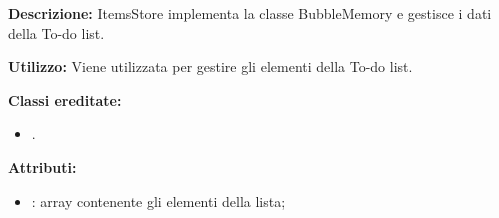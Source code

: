 \subparagraph[::ItemStore]{\class}\mbox{}\\ \label{\class}
\textbf{Descrizione:}
ItemsStore implementa la classe BubbleMemory e gestisce i dati della To-do list.

\textbf{Utilizzo:}
Viene utilizzata per gestire gli elementi della To-do list.

\textbf{Classi ereditate:}
\begin{itemize}
	\item {}.
\end{itemize}

\textbf{Attributi:}
\begin{itemize}
	\item {}: array contenente gli elementi della lista;
\end{itemize}

